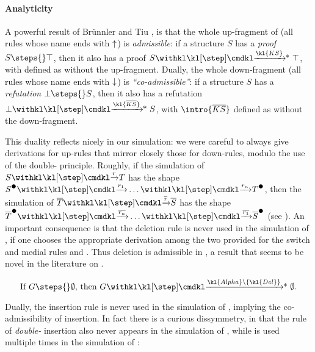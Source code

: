 \begin{scope}
\paragraph{Analyticity}

A powerful result of Brünnler and Tiu \cite{brunnler_local_2001}, is that the
whole up-fragment of  (all rules whose name ends with $\uparrow$) is
\emph{admissible}: if a structure $S$ has a \emph{proof} $S \steps{} \top$, then
it also has a proof $S \xsteps{\kl{KS}} \top$, with  defined as
 without the up-fragment. Dually, the whole
down-fragment (all rules whose name ends with $\downarrow$) is
\emph{``co-admissible''}: if a structure $S$ has a \emph{refutation} $\bot
\steps{} S$, then it also has a refutation $\bot \xsteps{\kl{\dmdual{KS}}} S$,
with $\intro{\dmdual{KS}}$ defined as  without the down-fragment.

This duality reflects nicely in our simulation: we were careful to always give
derivations for up-rules that mirror closely those for down-rules, modulo the
use of the double- principle. Roughly, if the simulation of $S \xstep{r} T$
has the shape $\strans{S} \xstep{r_1} \ldots \xstep{r_n} \strans{T}$, then the
simulation of $\dmdual{T} \xstep{\dmdual{r}} \dmdual{S}$ has the shape
$\strans{\dmdual{T}} \xstep{\dmdual{r_n}} \ldots \xstep{\dmdual{r_1}}
\strans{\dmdual{S}}$ (see ). An important consequence is
that the deletion rule  is never used in the simulation of , if
one chooses the appropriate derivation among the two provided for the switch and
medial rules  and . Thus deletion is admissible in , a
result that seems to be novel in the literature on .

\begin{corollary}\label{cor:adm-era}
  $$
  \text{If $G \steps{} \emptyset$, then $G \xsteps{\kl{Alpha}\setminus\{\kl{Del}\}}
  \emptyset$.}
  $$
\end{corollary}

Dually, the insertion rule  is never used in the simulation of
, implying the co-admissibility of insertion. In fact there is
a curious dissymmetry, in that the rule  of \emph{double-}
insertion also never appears in the simulation of , while
 is used multiple times in the simulation of :


\end{scope}
